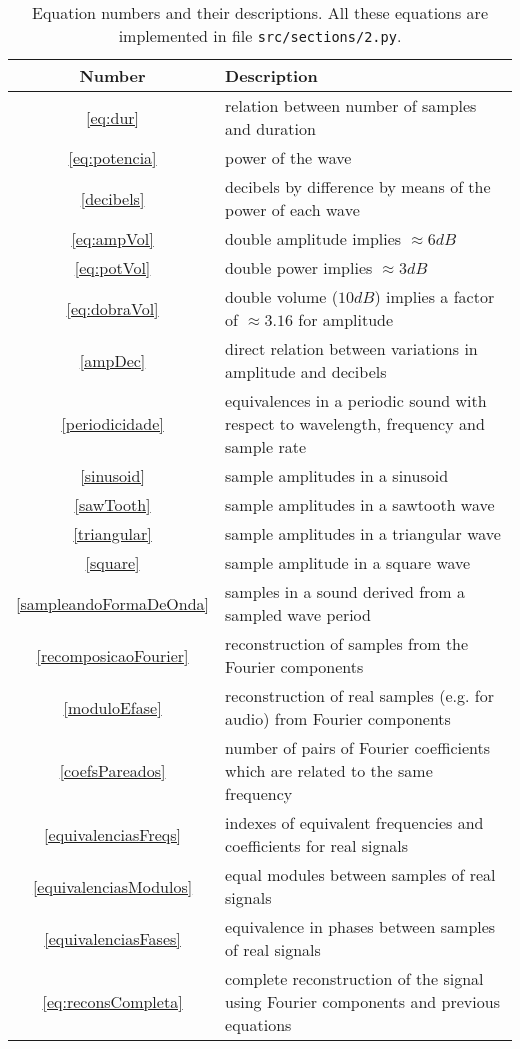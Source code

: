 \documentclass{scrreprt}
\newcommand*{\reff}[1]{%
	{\NoHyper\ref{#1}\endNoHyper}%
	  }
\begin{document}
\begin{table*}[htp!]
\centering
\caption{Equation numbers and their descriptions.
All these equations are implemented in file \texttt{src/sections/2.py}.}
\begin{tabular}{ c | p{12cm} }
   Number & Description \\\hline
 \reff{eq:dur} & relation between number of samples and duration \\
 \reff{eq:potencia} & power of the wave \\
 \reff{decibels} & decibels by difference by means of the power of each wave \\
 \reff{eq:ampVol} & double amplitude implies $\approx 6dB$ \\
 \reff{eq:potVol} & double power implies $\approx 3dB$ \\
 \reff{eq:dobraVol} & double volume ($10dB$) implies a factor of $\approx 3.16$ for amplitude \\
 \reff{ampDec} & direct relation between variations in amplitude and decibels \\
 \reff{periodicidade} & equivalences in a periodic sound with respect to wavelength, frequency and sample rate \\
 \reff{sinusoid} & sample amplitudes in a sinusoid \\
 \reff{sawTooth} & sample amplitudes in a sawtooth wave \\
 \reff{triangular} & sample amplitudes in a triangular wave \\
 \reff{square} & sample amplitude in a square wave \\
 \reff{sampleandoFormaDeOnda} & samples in a sound derived from a sampled wave period \\
 \reff{recomposicaoFourier} & reconstruction of samples from the Fourier components \\
 \reff{moduloEfase} & reconstruction of real samples (e.g. for audio) from Fourier components \\
 \reff{coefsPareados} & number of pairs of Fourier coefficients which are related to the same frequency \\
 \reff{equivalenciasFreqs} & indexes of equivalent frequencies and coefficients for real signals \\
 \reff{equivalenciasModulos} & equal modules between samples of real signals \\
 \reff{equivalenciasFases} & equivalence in phases between samples of real signals \\
 \reff{eq:reconsCompleta} & complete reconstruction of the signal using Fourier components and previous equations \\

\end{tabular}
\end{table*}
\end{document}
